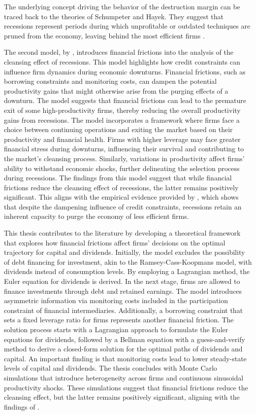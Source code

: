The underlying concept driving the behavior of the destruction margin can be traced back to the theories of Schumpeter
and Hayek. They suggest that recessions represent periods during which unprofitable or outdated techniques are pruned
from the economy, leaving behind the most efficient firms \cite{HaCa07}. \par
The second model, by \cite{OsePap17}, introduces financial frictions into the analysis of the cleansing effect of
recessions. This model highlights how credit constraints can influence firm dynamics during economic downturns.
Financial frictions, such as borrowing constraints and monitoring costs, can dampen the potential productivity gains
that might otherwise arise from the purging effects of a downturn. The model suggests that financial frictions can lead
to the premature exit of some high-productivity firms, thereby reducing the overall productivity gains from recessions.
The model incorporates a framework where firms face a choice between continuing operations and exiting the market based
on their productivity and financial health. Firms with higher leverage may face greater financial stress during
downturns, influencing their survival and contributing to the market's cleansing process. Similarly, variations in
productivity affect firms' ability to withstand economic shocks, further delineating the selection process during
recessions. The findings from this model suggest that while financial frictions reduce the cleansing effect of recessions, the
latter remains positively significant. This aligns with the empirical evidence provided by \cite{OsePap17}, which shows
that despite the dampening influence of credit constraints, recessions retain an inherent capacity to purge the economy
of less efficient firms.
\par
This thesis contributes to the literature by developing a theoretical framework that explores how financial frictions
affect firms' decisions on the optimal trajectory for capital and dividends. Initially, the model excludes the
possibility of debt financing for investment, akin to the Ramsey-Cass-Koopmans model, with dividends instead of
consumption levels. By employing a Lagrangian method, the Euler equation for dividends is derived. In the next stage,
firms are allowed to finance investments through debt and retained earnings. The model introduces asymmetric information
via monitoring costs included in the participation constraint of financial intermediaries. Additionally, a borrowing
constraint that sets a fixed leverage ratio for firms represents another financial friction. The solution process starts
with a Lagrangian approach to formulate the Euler equations for dividends, followed by a Bellman equation with a
guess-and-verify method to derive a closed-form solution for the optimal paths of dividends and capital. An important
finding is that monitoring costs lead to lower steady-state levels of capital and dividends. The thesis concludes with
Monte Carlo simulations that introduce heterogeneity across firms and continuous sinusoidal productivity shocks. These
simulations suggest that financial frictions reduce the cleansing effect, but the latter remains positively significant,
aligning with the findings of \cite{OsePap17}.
\par

